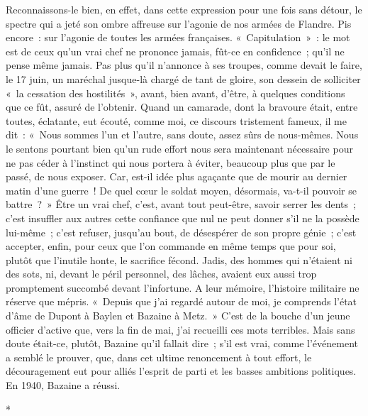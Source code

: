 \documentclass[french,twoside]{book} %
\begin{document}
Reconnaissons-le bien, en effet, dans cette expression pour une fois sans détour, le spectre qui a jeté son ombre affreuse sur l’agonie de nos armées de Flandre. Pis encore : sur l’agonie de toutes les armées françaises. « Capitulation » : le mot est de ceux qu’un vrai chef ne prononce jamais, fût-ce en confidence ; qu’il ne pense même jamais. Pas plus qu’il n’annonce à ses troupes, comme devait le faire, le 17 juin, un maréchal jusque-là chargé de tant de gloire, son dessein de solliciter « la cessation des hostilités », avant, bien avant, d’être, à quelques conditions que ce fût, assuré de l’obtenir. Quand un camarade, dont la bravoure était, entre toutes, éclatante, eut écouté, comme moi, ce discours tristement fameux, il me dit : « Nous sommes l’un et l’autre, sans doute, assez sûrs de nous-mêmes. Nous le sentons pourtant bien qu’un rude effort nous sera maintenant nécessaire pour ne pas céder à l’instinct qui nous portera à éviter, beaucoup plus que par le passé,   de nous exposer. Car, est-il idée plus agaçante que de mourir au dernier matin d’une guerre ! De quel cœur le soldat moyen, désormais, va-t-il pouvoir se battre ? » Être un vrai chef, c’est, avant tout peut-être, savoir serrer les dents ; c’est insuffler aux autres cette confiance que nul ne peut donner s’il ne la possède lui-même ; c’est refuser, jusqu’au bout, de désespérer de son propre génie ; c’est accepter, enfin, pour ceux que l’on commande en même temps que pour soi, plutôt que l’inutile honte, le sacrifice fécond. Jadis, des hommes qui n’étaient ni des sots, ni, devant le péril personnel, des lâches, avaient eux aussi trop promptement succombé devant l’infortune. A leur mémoire, l’histoire militaire ne réserve que mépris. « Depuis que j’ai regardé autour de moi, je comprends l’état d’âme de Dupont à Baylen et Bazaine à Metz. » C’est de la bouche d’un jeune officier d’active que, vers la fin de mai, j’ai recueilli ces mots terribles. Mais sans doute était-ce, plutôt, Bazaine qu’il fallait dire ; s’il est vrai, comme l’événement a semblé le prouver, que, dans cet ultime renoncement à tout effort, le découragement eut pour alliés l’esprit de parti et les basses ambitions politiques. En 1940, Bazaine a réussi.\par

\begin{center}
*\par
\end{center}
\end{document}
